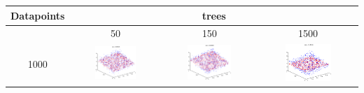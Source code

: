 \begin{landscape}
\begin{table}[p]
\begin{tabular}{|c|c|c|c|}
\toprule
Datapoints & \multicolumn{3}{|c|}{trees} \\ \hline
\midrule
& 50 & 150 & 1500 \\ \hline
1000 & \includegraphics[width=0.5\textwidth, height=0.35\textheight]{fig/plane_1k_50} & \includegraphics[width=0.5\textwidth, height=0.35\textheight]{fig/plane_1k_150} & \includegraphics[width=0.5\textwidth, height=0.4\textheight]{fig/plane_1k_1500} \\ \hline

\end{tabular}
\end{table}
\end{landscape}
